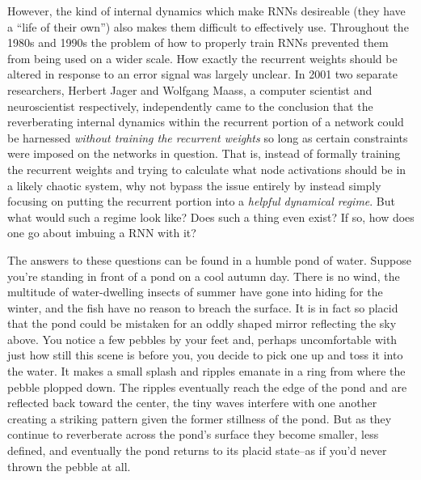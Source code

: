 However, the kind of internal dynamics which make RNNs desireable (they have a ``life of their own'') also makes them difficult to effectively use. Throughout the 1980s and 1990s the problem of how to properly train RNNs prevented them from being used on a wider scale. How exactly the recurrent weights should be altered in response to an error signal was largely unclear. In 2001 two separate researchers, Herbert Jager and Wolfgang Maass, a computer scientist and neuroscientist respectively, independently came to the conclusion that the reverberating internal dynamics within the recurrent portion of a network could be harnessed \emph{without training the recurrent weights} so long as certain constraints were imposed on the networks in question. That is, instead of formally training the recurrent weights and trying to calculate what node activations should be in a likely chaotic system, why not bypass the issue entirely by instead simply focusing on putting the recurrent portion into a \emph{helpful dynamical regime}. But what would such a regime look like? Does such a thing even exist? If so, how does one go about imbuing a RNN with it?

The answers to these questions can be found in a humble pond of water. Suppose you're standing in front of a pond on a cool autumn day. There is no wind, the multitude of  water-dwelling insects of summer have gone into hiding for the winter, and the fish have no reason to breach the surface. It is in fact so placid that the pond could be mistaken for an oddly shaped mirror reflecting the sky above. You notice a few pebbles by your feet and, perhaps uncomfortable with just how still this scene is before you, you decide to pick one up and toss it into the water. It makes a small splash and ripples emanate in a ring from where the pebble plopped down. The ripples eventually reach the edge of the pond and are reflected back toward the center, the tiny waves interfere with one another creating a striking pattern given the former stillness of the pond. But as they continue to reverberate across the pond's surface they become smaller, less defined, and eventually the pond returns to its placid state--as if you'd never thrown the pebble at all. 

